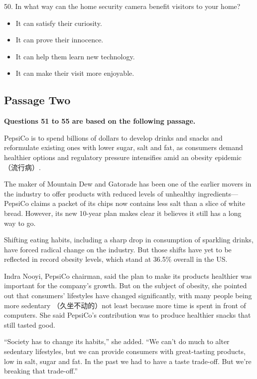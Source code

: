 \documentclass[UTF8,11pt]{ctexart}
\begin{document}
50. In what way can the home security camera benefit visitors to your home?


\begin{itemize}[leftmargin=2em,itemsep=.2em,topsep=.4em]\item[A.] It can satisfy their curiosity.
\item[B.] It can prove their innocence.
\item[C.] It can help them learn new technology.
\item[D.] It can make their visit more enjoyable.
\end{itemize}

\subsection*{\textbf{Passage Two}}


\textbf{Questions 51 to 55 are based on the following passage.}


PepsiCo is to spend billions of dollars to develop drinks and snacks and reformulate existing ones with lower sugar, salt and fat, as consumers demand healthier options and regulatory pressure intensifies amid an obesity epidemic （流行病）.


The maker of Mountain Dew and Gatorade has been one of the earlier movers in the industry to offer products with reduced levels of unhealthy ingredients—PepsiCo claims a packet of its chips now contains less salt than a slice of white bread. However, its new 10-year plan makes clear it believes it still has a long way to go.


Shifting eating habits, including a sharp drop in consumption of sparkling drinks, have forced radical change on the industry. But those shifts have yet to be reflected in record obesity levels, which stand at 36.5\% overall in the US.


Indra Nooyi, PepsiCo chairman, said the plan to make its products healthier was important for the company's growth. But on the subject of obesity, she pointed out that consumers’ lifestyles have changed significantly, with many people being more sedentary （久坐不动的）not least because more time is spent in front of computers. She said PepsiCo's contribution was to produce healthier snacks that still tasted good.


“Society has to change its habits,” she added. “We can't do much to alter sedentary lifestyles, but we can provide consumers with great-tasting products, low in salt, sugar and fat. In the past we had to have a taste trade-off. But we're breaking that trade-off.”
\end{document}
